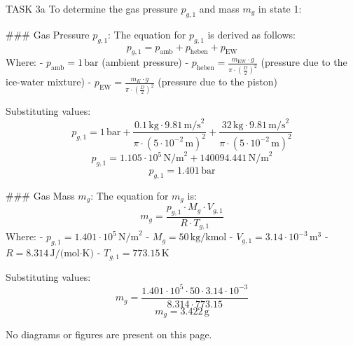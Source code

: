 TASK 3a  
To determine the gas pressure \( p_{g,1} \) and mass \( m_g \) in state 1:

### Gas Pressure \( p_{g,1} \):
The equation for \( p_{g,1} \) is derived as follows:  
\[
p_{g,1} = p_{\text{amb}} + p_{\text{heben}} + p_{\text{EW}}
\]
Where:  
- \( p_{\text{amb}} = 1 \, \text{bar} \) (ambient pressure)  
- \( p_{\text{heben}} = \frac{m_{\text{EW}} \cdot g}{\pi \cdot \left(\frac{D}{2}\right)^2} \) (pressure due to the ice-water mixture)  
- \( p_{\text{EW}} = \frac{m_K \cdot g}{\pi \cdot \left(\frac{D}{2}\right)^2} \) (pressure due to the piston)  

Substituting values:  
\[
p_{g,1} = 1 \, \text{bar} + \frac{0.1 \, \text{kg} \cdot 9.81 \, \text{m/s}^2}{\pi \cdot \left(5 \cdot 10^{-2} \, \text{m}\right)^2} + \frac{32 \, \text{kg} \cdot 9.81 \, \text{m/s}^2}{\pi \cdot \left(5 \cdot 10^{-2} \, \text{m}\right)^2}
\]
\[
p_{g,1} = 1.105 \cdot 10^5 \, \text{N/m}^2 + 140094.441 \, \text{N/m}^2
\]
\[
p_{g,1} = 1.401 \, \text{bar}
\]

### Gas Mass \( m_g \):
The equation for \( m_g \) is:  
\[
m_g = \frac{p_{g,1} \cdot M_g \cdot V_{g,1}}{R \cdot T_{g,1}}
\]
Where:  
- \( p_{g,1} = 1.401 \cdot 10^5 \, \text{N/m}^2 \)  
- \( M_g = 50 \, \text{kg/kmol} \)  
- \( V_{g,1} = 3.14 \cdot 10^{-3} \, \text{m}^3 \)  
- \( R = 8.314 \, \text{J/(mol·K)} \)  
- \( T_{g,1} = 773.15 \, \text{K} \)  

Substituting values:  
\[
m_g = \frac{1.401 \cdot 10^5 \cdot 50 \cdot 3.14 \cdot 10^{-3}}{8.314 \cdot 773.15}
\]
\[
m_g = 3.422 \, \text{g}
\]  

No diagrams or figures are present on this page.